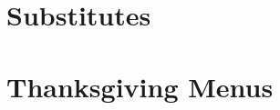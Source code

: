 \documentclass{article}
\begin{document}
\newpage


\newpage


\newpage


\newpage

\begin{appendices}        
\section{Substitutes}


\section{Thanksgiving Menus}


\printindex
\end{appendices}        
\end{document}
